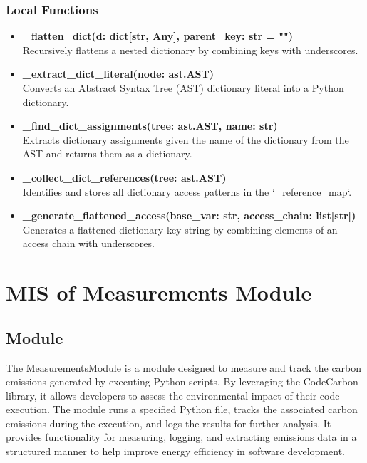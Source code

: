 \documentclass[12pt, titlepage]{article}
\begin{document}
\subsubsection{Local Functions}
\begin{itemize}
    \item \textbf{\_flatten\_dict(d: dict[str, Any], parent\_key: str = "")} \\
    Recursively flattens a nested dictionary by combining keys with underscores.

    \item \textbf{\_extract\_dict\_literal(node: ast.AST)} \\
    Converts an Abstract Syntax Tree (AST) dictionary literal into a Python dictionary.

    \item \textbf{\_find\_dict\_assignments(tree: ast.AST, name: str)} \\
    Extracts dictionary assignments given the name of the dictionary from the AST and returns them as a dictionary.

    \item \textbf{\_collect\_dict\_references(tree: ast.AST)} \\
    Identifies and stores all dictionary access patterns in the `\_reference\_map`.

    \item \textbf{\_generate\_flattened\_access(base\_var: str, access\_chain: list[str])} \\
    Generates a flattened dictionary key string by combining elements of an access chain with underscores.
\end{itemize}



\section{MIS of Measurements Module}

\subsection{Module}

The MeasurementsModule is a module designed to measure and track the carbon emissions generated by executing Python scripts. By leveraging the CodeCarbon library, it allows developers to assess the environmental impact of their code execution. The module runs a specified Python file, tracks the associated carbon emissions during the execution, and logs the results for further analysis. It provides functionality for measuring, logging, and extracting emissions data in a structured manner to help improve energy efficiency in software development.
\end{document}

